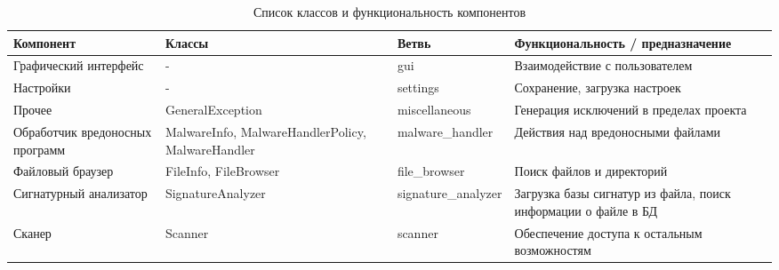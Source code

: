 \begin{table}[h]
\centering
\begin{tabular}{|p{25mm}|p{4cm}|l|p{4cm}|}
\hline
Компонент & Классы & Ветвь & Функциональность / предназначение \\
\hline
Графический интерфейс & - & gui & Взаимодействие с пользователем \\
\hline
Настройки & - & settings & Сохранение, загрузка настроек \\
\hline
Прочее & GeneralException & miscellaneous & Генерация исключений в пределах проекта \\
\hline
Обработчик вредоносных программ & MalwareInfo, MalwareHandlerPolicy, MalwareHandler & malware\_handler & Действия над вредоносными файлами \\
\hline
Файловый браузер & FileInfo, FileBrowser & file\_browser & Поиск файлов и директорий \\
\hline
Сигнатурный анализатор & SignatureAnalyzer & signature\_analyzer & Загрузка базы сигнатур из файла, поиск информации о файле в БД \\
\hline
Сканер & Scanner & scanner & Обеспечение доступа к остальным возможностям \\
\hline
\end{tabular}
\caption{Список классов и функциональность компонентов}
\label{table:components}
\end{table}
